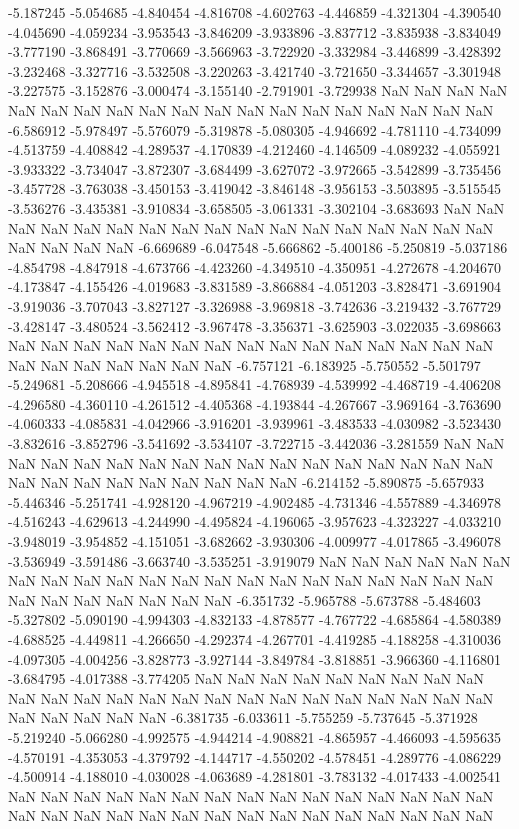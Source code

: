 -5.187245
-5.054685
-4.840454
-4.816708
-4.602763
-4.446859
-4.321304
-4.390540
-4.045690
-4.059234
-3.953543
-3.846209
-3.933896
-3.837712
-3.835938
-3.834049
-3.777190
-3.868491
-3.770669
-3.566963
-3.722920
-3.332984
-3.446899
-3.428392
-3.232468
-3.327716
-3.532508
-3.220263
-3.421740
-3.721650
-3.344657
-3.301948
-3.227575
-3.152876
-3.000474
-3.155140
-2.791901
-3.729938
NaN
NaN
NaN
NaN
NaN
NaN
NaN
NaN
NaN
NaN
NaN
NaN
NaN
NaN
NaN
NaN
NaN
NaN
NaN
-6.586912
-5.978497
-5.576079
-5.319878
-5.080305
-4.946692
-4.781110
-4.734099
-4.513759
-4.408842
-4.289537
-4.170839
-4.212460
-4.146509
-4.089232
-4.055921
-3.933322
-3.734047
-3.872307
-3.684499
-3.627072
-3.972665
-3.542899
-3.735456
-3.457728
-3.763038
-3.450153
-3.419042
-3.846148
-3.956153
-3.503895
-3.515545
-3.536276
-3.435381
-3.910834
-3.658505
-3.061331
-3.302104
-3.683693
NaN
NaN
NaN
NaN
NaN
NaN
NaN
NaN
NaN
NaN
NaN
NaN
NaN
NaN
NaN
NaN
NaN
NaN
NaN
NaN
NaN
-6.669689
-6.047548
-5.666862
-5.400186
-5.250819
-5.037186
-4.854798
-4.847918
-4.673766
-4.423260
-4.349510
-4.350951
-4.272678
-4.204670
-4.173847
-4.155426
-4.019683
-3.831589
-3.866884
-4.051203
-3.828471
-3.691904
-3.919036
-3.707043
-3.827127
-3.326988
-3.969818
-3.742636
-3.219432
-3.767729
-3.428147
-3.480524
-3.562412
-3.967478
-3.356371
-3.625903
-3.022035
-3.698663
NaN
NaN
NaN
NaN
NaN
NaN
NaN
NaN
NaN
NaN
NaN
NaN
NaN
NaN
NaN
NaN
NaN
NaN
NaN
NaN
NaN
NaN
-6.757121
-6.183925
-5.750552
-5.501797
-5.249681
-5.208666
-4.945518
-4.895841
-4.768939
-4.539992
-4.468719
-4.406208
-4.296580
-4.360110
-4.261512
-4.405368
-4.193844
-4.267667
-3.969164
-3.763690
-4.060333
-4.085831
-4.042966
-3.916201
-3.939961
-3.483533
-4.030982
-3.523430
-3.832616
-3.852796
-3.541692
-3.534107
-3.722715
-3.442036
-3.281559
NaN
NaN
NaN
NaN
NaN
NaN
NaN
NaN
NaN
NaN
NaN
NaN
NaN
NaN
NaN
NaN
NaN
NaN
NaN
NaN
NaN
NaN
NaN
NaN
NaN
NaN
-6.214152
-5.890875
-5.657933
-5.446346
-5.251741
-4.928120
-4.967219
-4.902485
-4.731346
-4.557889
-4.346978
-4.516243
-4.629613
-4.244990
-4.495824
-4.196065
-3.957623
-4.323227
-4.033210
-3.948019
-3.954852
-4.151051
-3.682662
-3.930306
-4.009977
-4.017865
-3.496078
-3.536949
-3.591486
-3.663740
-3.535251
-3.919079
NaN
NaN
NaN
NaN
NaN
NaN
NaN
NaN
NaN
NaN
NaN
NaN
NaN
NaN
NaN
NaN
NaN
NaN
NaN
NaN
NaN
NaN
NaN
NaN
NaN
NaN
NaN
NaN
-6.351732
-5.965788
-5.673788
-5.484603
-5.327802
-5.090190
-4.994303
-4.832133
-4.878577
-4.767722
-4.685864
-4.580389
-4.688525
-4.449811
-4.266650
-4.292374
-4.267701
-4.419285
-4.188258
-4.310036
-4.097305
-4.004256
-3.828773
-3.927144
-3.849784
-3.818851
-3.966360
-4.116801
-3.684795
-4.017388
-3.774205
NaN
NaN
NaN
NaN
NaN
NaN
NaN
NaN
NaN
NaN
NaN
NaN
NaN
NaN
NaN
NaN
NaN
NaN
NaN
NaN
NaN
NaN
NaN
NaN
NaN
NaN
NaN
NaN
NaN
-6.381735
-6.033611
-5.755259
-5.737645
-5.371928
-5.219240
-5.066280
-4.992575
-4.944214
-4.908821
-4.865957
-4.466093
-4.595635
-4.570191
-4.353053
-4.379792
-4.144717
-4.550202
-4.578451
-4.289776
-4.086229
-4.500914
-4.188010
-4.030028
-4.063689
-4.281801
-3.783132
-4.017433
-4.002541
NaN
NaN
NaN
NaN
NaN
NaN
NaN
NaN
NaN
NaN
NaN
NaN
NaN
NaN
NaN
NaN
NaN
NaN
NaN
NaN
NaN
NaN
NaN
NaN
NaN
NaN
NaN
NaN
NaN
NaN
